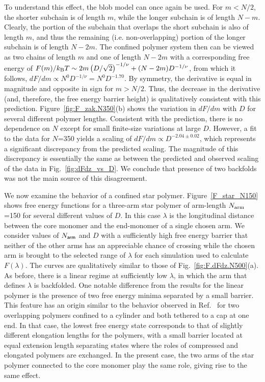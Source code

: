 \documentclass[journal=mamobx,manuscript=article,layout=twocolumn]{achemso}
\begin{document}
To understand this effect, the blob model can once again be used. For $m<N/2$,
the shorter subchain is of length $m$, while the longer subchain is of length
$N-m$. Clearly, the portion of the subchain that overlaps the short subchain
is also of length $m$, and thus the remaining (i.e. non-overlapping) portion 
of the longer subchain is of length $N-2m$. The confined polymer system then can
be viewed as two chains of length $m$ and one of length $N-2m$ with a corresponding
free energy of
$F(m)/k_{\rm B}T \sim 2 m\left(D/\sqrt{2}\right)^{-1/\nu} + (N-2m) D^{-1/\nu}$,
from which it follows, $dF/dm\propto N^0D^{-1/\nu} = N^0D^{-1.70}$. By symmetry, 
the derivative is equal in magnitude and opposite in sign for $m>N/2$. 
Thus, the decrease in the derivative (and, therefore, the free energy barrier height)
is qualitatively consistent with this prediction. Figure~\ref{fig:F_zak.N350}(b)
shows the variation in $dF/dm$ with $D$ for several different polymer lengths.
Consistent with the prediction, there is no dependence on $N$ except for small
finite-size variations at large $D$. However, a fit to the data for $N$=350
yields a scaling of $dF/dm \propto D^{-2.04\pm 0.02}$, which represents a significant
discrepancy from the predicted scaling. The magnitude of this discrepancy
is essentially the same as between the predicted and observed scaling of the data in 
Fig.~\ref{fig:dFdz_vs_D}. We conclude that presence of two backfolds was not
the main source of this disagreement.

We now examine the behavior of a confined star polymer.
Figure~\ref{F_star_N150} shows free energy functions for a three-arm star polymer 
of arm-length $N_{\rm arm}$=150 for several different values of $D$. In this case 
$\lambda$ is the longitudinal distance between the core monomer and the end-monomer
of a single chosen arm. We consider values of $N_{\sf arm}$ and $D$ with a sufficiently
high free energy barrier that neither of the other arms has an appreciable chance of
crossing while the chosen arm is brought to the selected range of $\lambda$ for each
simulation used to calculate $F(\lambda)$.  The curves are qualitatively similar to those of 
Fig.~\ref{fig:F.dFdz.N500}(a). As before, there is a linear regime at sufficiently low
$\lambda$, in which the arm that defines $\lambda$ is backfolded.  One notable difference 
from the results for the linear polymer is the presence of two free energy
minima separated by a small barrier. This feature has an origin similar to the behavior
observed in Ref.~ for two overlapping polymers confined to a 
cylinder and both tethered to a cap at one end. In that case, the lowest free energy
state corresponds to that of slightly different elongation lengths for the polymers,
with a small barrier located at equal extension length separating states where the
roles of compressed and elongated polymers are exchanged. In the present case, the two 
arms of the star polymer connected to the core monomer play the same role, giving rise to
the same effect.
\end{document}
